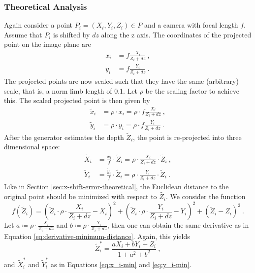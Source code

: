 \subsubsection{Theoretical Analysis}
Again consider a point $P_i=(X_i, Y_i, Z_i) \in P$ and a camera with focal length $f$. Assume that $P_i$ is shifted by $dz$ along the z axis.
The coordinates of the projected point on the image plane are
\begin{align}
	x_i &= f \frac{X_i}{Z_i + dz} \ , \\
	y_i &= f \frac{Y_i}{Z_i + dz} \ .
\end{align}
The projected points are now scaled such that they have the same (arbitrary) scale, that is, a norm limb length of 0.1.
Let $\rho$ be the scaling factor to achieve this.
The scaled projected point is then given by
\begin{align}
		\widetilde{x}_i &= \rho \cdot x_i 
		= \rho \cdot f \frac{X_i}{Z_i + dz} \ , \\
		\widetilde{y}_i &= \rho \cdot y_i
		= \rho \cdot f \frac{Y_i}{Z_i + dz} \ .
\end{align}
After the generator estimates the depth $\widetilde{Z}_i$, the point is re-projected into three dimensional space:
\begin{align}
	\widetilde{X}_i &= \frac{\widetilde{x}_i}{f} \cdot \widetilde{Z}_i
	= \rho \cdot \frac{X_i}{Z_i + dz} \cdot \widetilde{Z}_i \ , \\
	\widetilde{Y}_i &= \frac{\widetilde{y}_i}{f} \cdot \widetilde{Z}_i
	= \rho \cdot \frac{Y_i}{Z_i + dz}\cdot \widetilde{Z}_i \ .
\end{align}
Like in Section \ref{sec:x-shift-error-theoretical}, the Euclidean distance to the original point should be minimized with respect to $\widetilde{Z_i}$.
We consider the function
\begin{equation}
	f(\widetilde{Z}_i) = \left ( \widetilde{Z}_i \cdot \rho  \cdot \frac{X_i}{Z_i + dz}- X_i \right)^2 + 
					\left ( \widetilde{Z}_i \cdot \rho \cdot \frac{Y_i}{Z_i + dz} - Y_i \right)^2
					 + \left ( \widetilde{Z}_i - Z_i \right)^2 \ .
\end{equation}
Let $a \coloneqq \rho \cdot \frac{X_i}{Z_i + dz}$ and $b \coloneqq \rho \cdot \frac{Y_i}{Z_i + dz}$, then one can obtain the same derivative as in Equation \eqref{eq:derivative-minimum-distance}.
Again, this yields
\begin{equation}
	\widetilde{Z}_i^\ast = \frac{a X_i + b Y_i + Z_i}{1 + a^2 + b^2} \ ,
\end{equation}
and $\widetilde{X}_i^\ast$ and $\widetilde{Y}_i^\ast$ as in Equations \eqref{eq:x_i-min} and \eqref{eq:y_i-min}.

